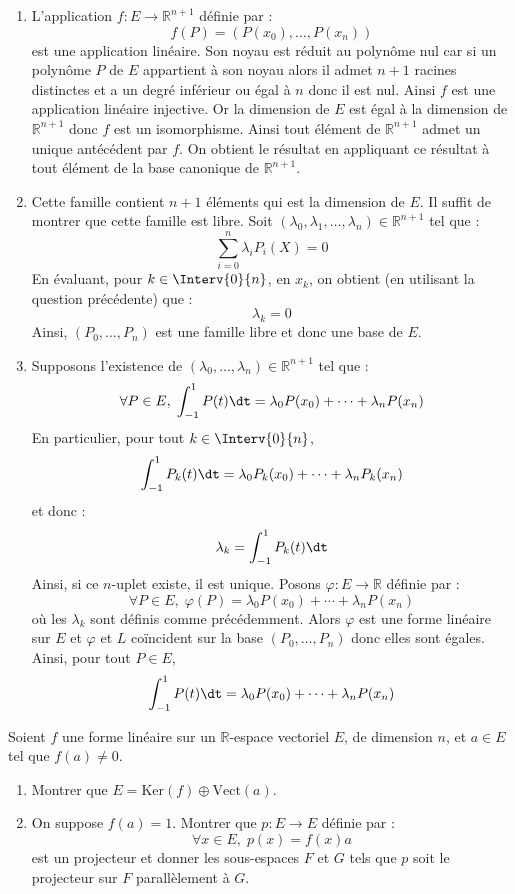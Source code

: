 \documentclass[a4paper,10pt]{report}
\begin{document}
\begin{enumerate}
\item L'application $f : E \rightarrow \mathbb{R}^{n+1}$ définie par :
$$ f(P) = (P(x_0), \ldots, P(x_n))$$
est une application linéaire. Son noyau est réduit au polynôme nul car si un polynôme $P$ de $E$ appartient à son noyau alors il admet $n+1$ racines distinctes et a un degré inférieur ou égal à $n$ donc il est nul. Ainsi $f$ est une application linéaire injective. Or la dimension de $E$ est égal à la dimension de $\mathbb{R}^{n+1}$ donc $f$ est un isomorphisme. Ainsi tout élément de $\mathbb{R}^{n+1}$ admet un unique antécédent par $f$. On obtient le résultat en appliquant ce résultat à tout élément de la base canonique de $\mathbb{R}^{n+1}$.
\item Cette famille contient $n+1$ éléments qui est la dimension de $E$. Il suffit de montrer que cette famille est libre. Soit $(\lambda_0, \lambda_1, \ldots, \lambda_n) \in \mathbb{R}^{n+1}$ tel que :
$$ \sum_{i=0}^n \lambda_i P_i (X)= 0$$
En évaluant, pour $k \in \Interv{0}{n}$, en $x_k$, on obtient (en utilisant la question précédente) que :
$$ \lambda_k =0$$
Ainsi, $(P_0, \ldots, P_n)$ est une famille libre et donc une base de $E$.
\item Supposons l'existence de $(\lambda_0, \ldots, \lambda_n) \in \mathbb{R}^{n+1}$ tel que :
$$ \forall P \in E, \; \int_{-1}^1 P(t) \dt = \lambda_0 P(x_0) + \cdots + \lambda_n P(x_n)$$
En particulier, pour tout $k \in \Interv{0}{n}$,
$$ \int_{-1}^1 P_k(t) \dt = \lambda_0 P_k(x_0) + \cdots + \lambda_n P_k(x_n)$$
et donc :
$$ \lambda_k =  \int_{-1}^1 P_k(t) \dt$$
Ainsi, si ce $n$-uplet existe, il est unique. Posons $\varphi : E \rightarrow \mathbb{R}$ définie par :
$$  \forall P \in E, \;  \varphi(P)= \lambda_0 P(x_0) + \cdots + \lambda_n P(x_n)$$
où les $\lambda_k$ sont définis comme précédemment. Alors $\varphi$ est une forme linéaire sur $E$ et $\varphi$ et $L$ coïncident sur la base $(P_0, \ldots, P_n)$ donc elles sont égales. Ainsi, pour tout $P \in E$,
$$ \int_{-1}^1 P(t) \dt = \lambda_0 P(x_0) + \cdots + \lambda_n P(x_n)$$
\end{enumerate}

\medskip

\begin{Exa} Soient $f$ une forme linéaire sur un $\mathbb{R}$-espace vectoriel $E$, de dimension $n$, et $a\in E$ tel que $f(a)\neq 0$.
\begin{enumerate}
\item Montrer que $E=\textrm{Ker}(f)\oplus\textrm{Vect}(a)$.
\item On suppose $f(a)=1$. Montrer que $p : E \rightarrow E$ définie par :
$$ \forall x \in E, \; p(x) = f(x) a $$
est un projecteur et donner les sous-espaces $F$ et $G$ tels que $p$ soit le projecteur sur $F$ parallèlement à $G$.
\end{enumerate}
\end{Exa}
\end{document}
